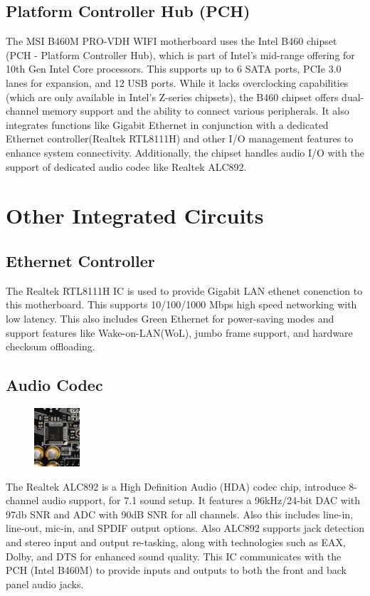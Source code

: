 \documentclass{article}
\begin{document}
\subsection{Platform Controller Hub (PCH)} 
The MSI B460M PRO-VDH WIFI motherboard uses the Intel B460 chipset 
(PCH - Platform Controller Hub), which is part of Intel’s mid-range 
offering for 10th Gen Intel Core processors. This supports  up to 6 SATA ports, PCIe 3.0 lanes for expansion, 
and 12 USB ports. While it lacks overclocking capabilities (which are only 
available in Intel’s Z-series chipsets), the B460 chipset offers 
dual-channel memory support and the ability to connect various peripherals.
 It also integrates functions like Gigabit Ethernet in 
 conjunction with a dedicated Ethernet controller(Realtek RTL8111H) and other I/O management
 features to enhance system connectivity.
Additionally, the chipset handles audio I/O with the support of dedicated audio codec
like Realtek ALC892.



\section{Other Integrated Circuits}
\subsection{Ethernet Controller}

The Realtek RTL8111H IC is used to provide Gigabit LAN ethenet conenction 
to this motherboard. This supports 10/100/1000 Mbps  high speed networking 
with low latency. This also includes Green Ethernet for power-saving modes 
and support features like Wake-on-LAN(WoL), jumbo frame support, and 
hardware checksum offloading.

\subsection{Audio Codec}
\begin{figure}
	\vspace{-15pt} 
	\centering
	\includegraphics[width=0.15\textwidth]{audiocodec.jpg}
\end{figure}
The Realtek ALC892 is a High Definition Audio (HDA) codec chip, 
introduce 8-channel audio support, for 7.1 sound setup. It features a 
96kHz/24-bit DAC with 97db SNR and ADC with 90dB SNR for all channels. 
Also this includes line-in, line-out, mic-in, and SPDIF output options. 
Also ALC892 supports jack detection and stereo input and output re-tasking, 
along with technologies such as EAX, Dolby, and DTS for enhanced sound 
quality. This IC communicates with the PCH (Intel B460M) to provide inputs 
and outputs to both the front and back panel audio jacks.
\end{document}
